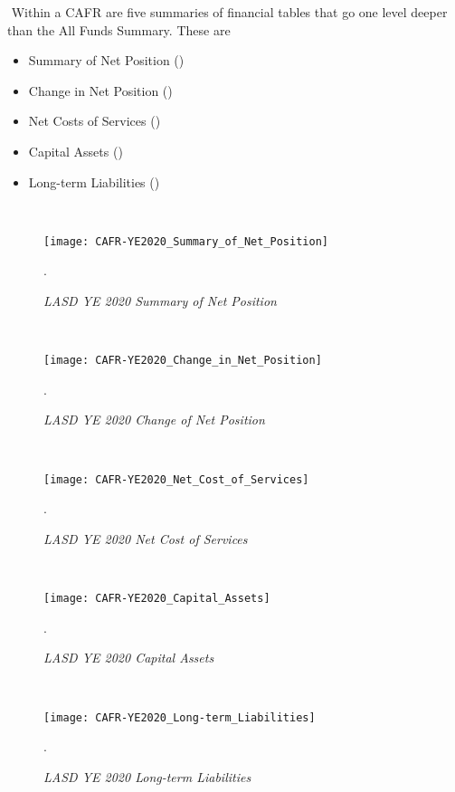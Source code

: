     ﻿
    Within a CAFR are five summaries of financial tables that go one level deeper than the All Funds Summary. These are
    \begin{itemize}\OnehalfSpacing%
        \item Summary of Net Position ()
        \item Change in Net Position  ()
        \item Net Costs of Services   ()
        \item Capital Assets          ()
        \item Long-term Liabilities   ()
      \end{itemize}
    ﻿
    \begin{figure}
      \centering
      \caption[LASD YE 2020 Summary of Net Position]{\textit{LASD YE 2020 Summary of Net Position}}%
      \label{fig:net-position}
      \texttt{[image: CAFR-YE2020\_Summary\_of\_Net\_Position]}\\
      \footnotesize\raggedright\textcite[6]{Kenyon2021}.
    \end{figure}
    ﻿
    \begin{figure}
      \centering
      \caption[LASD YE 2020 Change of Net Position]{\textit{LASD YE 2020 Change of Net Position}}\label{fig:Change_Position}
      \texttt{[image: CAFR-YE2020\_Change\_in\_Net\_Position]}\\
      \footnotesize\raggedright\textcite[7]{Kenyon2021}.
    \end{figure}
    ﻿
    \begin{figure}
      \centering
      \caption[LASD YE 2020 Net Cost of Services]{\textit{LASD YE 2020 Net Cost of Services}}%
      \label{fig:Cost_Services}
      \texttt{[image: CAFR-YE2020\_Net\_Cost\_of\_Services]}\\
      \footnotesize\raggedright\textcite[9]{Kenyon2021}.
    \end{figure}
    ﻿
    \begin{figure}
      \centering
      \caption[LASD YE 2020 Capital Assets]{\textit{LASD YE 2020 Capital Assets}}%
      \label{fig:Capital_Assets}
      \texttt{[image: CAFR-YE2020\_Capital\_Assets]}\\
      \footnotesize\raggedright\textcite[10]{Kenyon2021}.
    \end{figure}
    ﻿
    \begin{figure}
      \centering
      \caption[LASD YE 2020 Long-term Liabilities]{\textit{LASD YE 2020 Long-term Liabilities}}%
      \label{fig:Long-term_Liabilities}
      \texttt{[image: CAFR-YE2020\_Long-term\_Liabilities]}\\
      \footnotesize\raggedright\textcite[11]{Kenyon2021}.
    \end{figure}%

